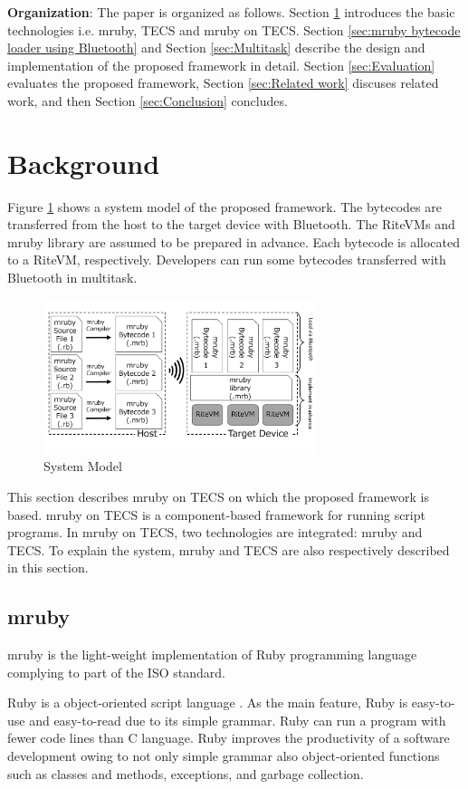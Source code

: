 \documentclass[conference,compsoc]{IEEEtran}
\providecommand{\DIFadd}[1]{{\protect\color{blue}\uwave{#1}}} %
\providecommand{\DIFaddbegin}{} %
\providecommand{\DIFaddend}{} %
\begin{document}
{\bf Organization}: The paper is organized as follows.
Section \ref{sec:Background} introduces the basic technologies i.e. mruby, TECS and mruby on TECS.
Section \ref{sec:mruby bytecode loader using Bluetooth} and Section \ref{sec:Multitask} describe the design and implementation of the proposed framework in detail.
Section \ref{sec:Evaluation} evaluates the proposed framework, Section \ref{sec:Related work} discuses related work, and then Section \ref{sec:Conclusion} concludes.

\section{Background}
\label{sec:Background}
Figure \ref{fig:proposed} shows a system model of the proposed framework.
The bytecodes are transferred from the host to the target device with Bluetooth.
The RiteVMs and mruby library are assumed to be prepared in advance.
Each bytecode is allocated to a RiteVM, respectively.
Developers can run some bytecodes transferred with Bluetooth in multitask.

\begin{figure}[t]
    \centering
    \includegraphics[width=8cm,clip]{figure/proposed.pdf}
    \caption{System Model}
    \label{fig:proposed}
\end{figure}

This section describes mruby on TECS on which the proposed framework is based.
mruby on TECS is a component-based framework for running script programs.
In mruby on TECS, two technologies are integrated: mruby and TECS.
To explain the system, mruby and TECS are also respectively described in this section.

\subsection{mruby}
\label{sec:mruby}
mruby is the light-weight implementation of Ruby programming language complying to part of the ISO standard.

Ruby is a object-oriented script language \DIFaddbegin \DIFadd{\mbox{%
\cite{url:Ruby}}%
}\DIFaddend .
As the main feature, Ruby is easy-to-use and easy-to-read due to its simple grammar.
Ruby can run a program with fewer code lines than C language.
Ruby improves the productivity of a software development owing to not only simple grammar also object-oriented functions such as classes and methods, exceptions, and garbage collection.
\end{document}
